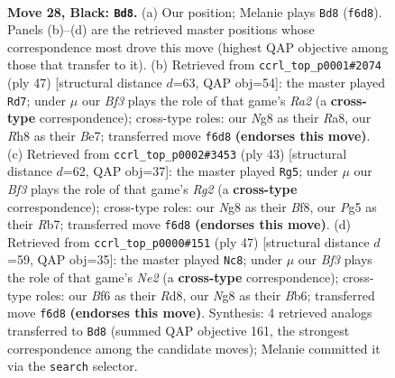 \documentclass[11pt]{article}
\begin{document}
\clearpage

\begin{figure}[p]\centering
\begin{subfigure}{0.46\textwidth}\centering
\resizebox{\linewidth}{!}{%
\newchessgame
\chessboard[
  setfen={2r3nr/p4k1p/2p2b2/6p1/8/3B1P1P/PPP2KPB/RR6 b - - 1 28},
  showmover=false,
  pgfstyle=straightmove, color=movearrow, markmove={f6-d8}
]}
\caption{}
\end{subfigure}\hfill
\begin{subfigure}{0.46\textwidth}\centering
\resizebox{\linewidth}{!}{%
\newchessgame
\chessboard[
  setfen={r7/r3bkpp/1p3p2/1Pp5/P7/2B2PP1/R4P1P/R5K1 b - - 4 24},
  showmover=false,
  pgfstyle=straightmove, color=movearrow, markmove={a7-d7}
]}
\caption{}
\end{subfigure}
\\[4pt]
\begin{subfigure}{0.46\textwidth}\centering
\resizebox{\linewidth}{!}{%
\newchessgame
\chessboard[
  setfen={4kb2/1r1n1pr1/p3pp2/8/P2B4/6P1/N1P2P1P/R4RK1 b - - 0 22},
  showmover=false,
  pgfstyle=straightmove, color=movearrow, markmove={g7-g5}
]}
\caption{}
\end{subfigure}\hfill
\begin{subfigure}{0.46\textwidth}\centering
\resizebox{\linewidth}{!}{%
\newchessgame
\chessboard[
  setfen={3r1k2/pp2n3/1b5r/3P1p1p/1PB1pP2/P7/1B4PP/1K1R3R b - - 7 24},
  showmover=false,
  pgfstyle=straightmove, color=movearrow, markmove={e7-c8}
]}
\caption{}
\end{subfigure}
\caption{\textbf{Move 28, Black: \texttt{Bd8}.} (a) Our position; Melanie plays \texttt{Bd8} (\texttt{f6d8}). Panels (b)--(d) are the retrieved master positions whose correspondence most drove this move (highest QAP objective among those that transfer to it). (b) Retrieved from \texttt{ccrl\_top\_p0001\#2074} (ply 47) [structural distance $d$=63, QAP obj=54]: the master played \texttt{Rd7}; under $\mu$ our \emph{Bf3} plays the role of that game's \emph{Ra2} (a \textbf{cross-type} correspondence); cross-type roles: our \emph{N}g8 as their \emph{R}a8, our \emph{R}h8 as their \emph{B}e7; transferred move \texttt{f6d8} \textbf{(endorses this move)}. (c) Retrieved from \texttt{ccrl\_top\_p0002\#3453} (ply 43) [structural distance $d$=62, QAP obj=37]: the master played \texttt{Rg5}; under $\mu$ our \emph{Bf3} plays the role of that game's \emph{Rg2} (a \textbf{cross-type} correspondence); cross-type roles: our \emph{N}g8 as their \emph{B}f8, our \emph{P}g5 as their \emph{R}b7; transferred move \texttt{f6d8} \textbf{(endorses this move)}. (d) Retrieved from \texttt{ccrl\_top\_p0000\#151} (ply 47) [structural distance $d$=59, QAP obj=35]: the master played \texttt{Nc8}; under $\mu$ our \emph{Bf3} plays the role of that game's \emph{Ne2} (a \textbf{cross-type} correspondence); cross-type roles: our \emph{B}f6 as their \emph{R}d8, our \emph{N}g8 as their \emph{B}b6; transferred move \texttt{f6d8} \textbf{(endorses this move)}. Synthesis: 4 retrieved analogs transferred to \texttt{Bd8} (summed QAP objective 161, the strongest correspondence among the candidate moves); Melanie committed it via the \texttt{search} selector.}
\label{fig:thought-m55}
\end{figure}
\end{document}
